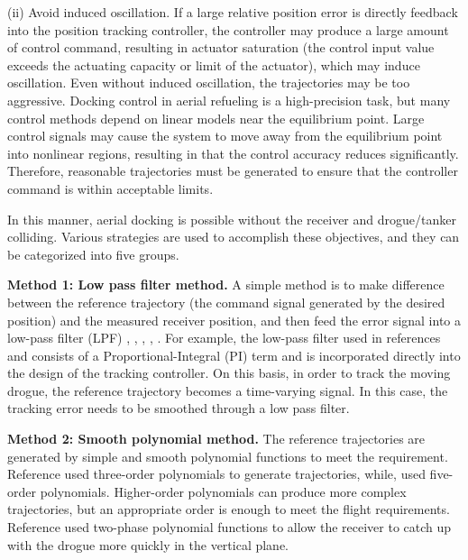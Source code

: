 (ii) Avoid induced oscillation. If a large relative position error
is directly feedback into the position tracking controller, the controller
may produce a large amount of control command, resulting in actuator
saturation (the control input value exceeds the actuating capacity
or limit of the actuator), which may induce oscillation. Even without
induced oscillation, the trajectories may be too aggressive. Docking
control in aerial refueling is a high-precision task, but many control
methods depend on linear models near the equilibrium point. Large
control signals may cause the system to move away from the equilibrium
point into nonlinear regions, resulting in that the control accuracy
reduces significantly. Therefore, reasonable trajectories must be
generated to ensure that the controller command is within acceptable
limits.

In this manner, aerial docking is possible without the receiver and
drogue/tanker colliding. Various strategies are used to accomplish
these objectives, and they can be categorized into five groups.

\textbf{Method 1: Low pass filter method.} A simple method is to make
difference between the reference trajectory (the command signal generated
by the desired position) and the measured receiver position, and then
feed the error signal into a low-pass filter (LPF) \cite{valasek2002vision}
\cite{kimmett2002vision}, \cite{kimmett2002autonomous}, \cite{wang2010verifiable},
\cite{wang2008novel}, \cite{fravolini2003development}. For example,
the low-pass filter used in references \cite{valasek2002vision} and
\cite{kimmett2002autonomous} consists of a Proportional-Integral
(PI) term and is incorporated directly into the design of the tracking
controller. On this basis, in order to track the moving drogue, the
reference trajectory becomes a time-varying signal. In this case,
the tracking error needs to be smoothed through a low pass filter.

\textbf{Method 2: Smooth polynomial method.} The reference trajectories
are generated by simple and smooth polynomial functions to meet the
requirement. Reference \cite{fravolini2004modeling} used three-order
polynomials to generate trajectories, while\cite{tandale2006trajectory},
\cite{valasek2017fault} used five-order polynomials. Higher-order
polynomials can produce more complex trajectories, but an appropriate
order is enough to meet the flight requirements. Reference \cite{liu2011flight}
used two-phase polynomial functions to allow the receiver to catch
up with the drogue more quickly in the vertical plane.

